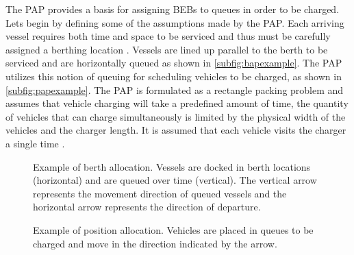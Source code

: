 \documentclass[ee,msthesis]{usuthesis}
\begin{document}
The PAP provides a basis for assigning BEBs to queues in order to be charged. Lets begin by defining some of the
assumptions made by the PAP. Each arriving vessel requires both time and space to be serviced and thus must be carefully
assigned a berthing location \cite{imai-2001-dynam-berth}. Vessels are lined up parallel to the berth to be serviced
and are horizontally queued as shown in \autoref{subfig:bapexample}. The PAP utilizes this notion of queuing for
scheduling vehicles to be charged, as shown in \autoref{subfig:papexample}. The PAP is formulated as a rectangle packing
problem and assumes that vehicle charging will take a predefined amount of time, the quantity of vehicles that can
charge simultaneously is limited by the physical width of the vehicles and the charger length. It is assumed that each
vehicle visits the charger a single time \cite{qarebagh-2019-optim-sched}.

\begin{subfigures}
    \begin{figure}[htpb]
    \centering
        
        \caption{Example of berth allocation. Vessels are docked in berth locations (horizontal) and are queued over
          time (vertical). The vertical arrow represents the movement direction of queued vessels and the horizontal
          arrow represents the direction of departure.}
        \label{subfig:bapexample}
    \end{figure}
    \hfill

    \begin{figure}[htpb]
    \centering
        
        \caption{Example of position allocation. Vehicles are placed in queues to be charged and move in the direction
          indicated by the arrow.}
        \label{subfig:papexample}
    \end{figure}
\end{subfigures}
\end{document}
